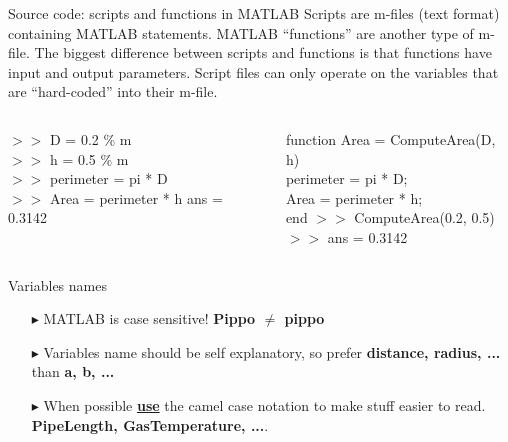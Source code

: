 \documentclass[xcolor={dvipsnames,rgb}, aspectratio=169]{beamer}
\begin{document}
\begin{frame}{Source code: scripts and functions in MATLAB}
Scripts are m-files (text format) containing MATLAB statements. MATLAB ``functions'' are
another type of m-file. The biggest difference between scripts and functions is that
functions have input and output parameters. Script files can only operate on the
variables that are ``hard-coded'' into their m-file.

\begin{columns}[T]%
   \begin{tcolorbox}[colback=white,colframe=bluepoli]
      $>>$ D = 0.2 \color{codegreen} \% m \color{black} \\
      $>>$ h = 0.5 \color{codegreen} \% m \color{black}\\
      $>>$ perimeter = pi * D\\
      $>>$ Area = perimeter * h
      \tcblower
      ans = 0.3142
   \end{tcolorbox}
   \begin{tcolorbox}[colback=white,colframe=bluepoli]
      \color{blue} function \color{black}
      Area = ComputeArea(D, h) \\
      perimeter = pi * D; \\
      Area = perimeter * h;\\
      \color{blue} end
      \tcblower
      $>>$ ComputeArea(0.2, 0.5) \\
      $>>$ ans = 0.3142
   \end{tcolorbox}
\end{columns}
\end{frame}

\begin{frame}{Variables names}
\begin{itemize}
   \item[$\blacktriangleright$] MATLAB is case sensitive! \textbf{Pippo $\neq$ pippo}
   \item[$\blacktriangleright$] Variables name should be self explanatory, so prefer
      \textbf{distance, radius, ...} than \textbf{a, b, ...}
   \item[$\blacktriangleright$] When possible \underline{\textbf{use}} the camel case
      notation to make stuff easier to read. \textbf{PipeLength, GasTemperature, ...}.
\end{itemize}
\end{frame}
\end{document}
